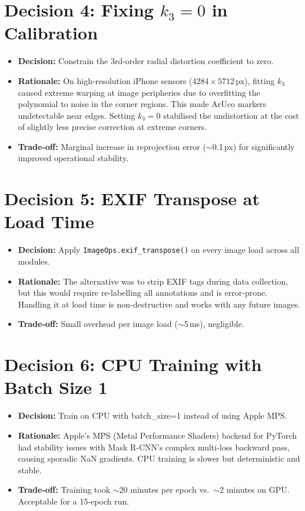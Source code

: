 \documentclass[12pt, a4paper, twoside]{report}
\begin{document}
\section{Decision 4: Fixing $k_3 = 0$ in Calibration}
\begin{itemize}
    \item \textbf{Decision:} Constrain the 3rd-order radial distortion coefficient to zero.
    \item \textbf{Rationale:} On high-resolution iPhone sensors ($4284 \times 5712$\,px), fitting $k_3$ caused extreme warping at image peripheries due to overfitting the polynomial to noise in the corner regions. This made ArUco markers undetectable near edges. Setting $k_3 = 0$ stabilised the undistortion at the cost of slightly less precise correction at extreme corners.
    \item \textbf{Trade-off:} Marginal increase in reprojection error ($\sim$0.1\,px) for significantly improved operational stability.
\end{itemize}

\section{Decision 5: EXIF Transpose at Load Time}
\begin{itemize}
    \item \textbf{Decision:} Apply \texttt{ImageOps.exif\_transpose()} on every image load across all modules.
    \item \textbf{Rationale:} The alternative was to strip EXIF tags during data collection, but this would require re-labelling all annotations and is error-prone. Handling it at load time is non-destructive and works with any future images.
    \item \textbf{Trade-off:} Small overhead per image load ($\sim$5\,ms), negligible.
\end{itemize}

\section{Decision 6: CPU Training with Batch Size 1}
\begin{itemize}
    \item \textbf{Decision:} Train on CPU with batch\_size=1 instead of using Apple MPS.
    \item \textbf{Rationale:} Apple's MPS (Metal Performance Shaders) backend for PyTorch had stability issues with Mask R-CNN's complex multi-loss backward pass, causing sporadic NaN gradients. CPU training is slower but deterministic and stable.
    \item \textbf{Trade-off:} Training took $\sim$20 minutes per epoch vs.\ $\sim$2 minutes on GPU. Acceptable for a 15-epoch run.
\end{itemize}
\end{document}
